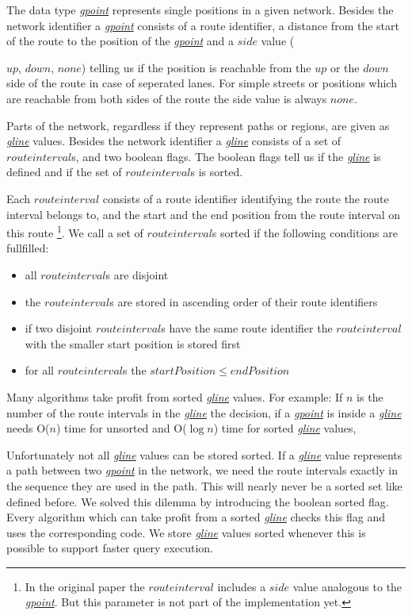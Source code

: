 \documentclass[a4paper]{article}
\newcommand{\dt}[1]{\textsl{\underline{#1}}}
\begin{document}
The data type \dt{gpoint} represents single positions in a given network. Besides the
network identifier a \dt{gpoint} consists of a route identifier, a distance from
the start of the route to the position of the \dt{gpoint} and a $side$ value
({$up$, $down$, $none$) telling us if the position is reachable from the $up$
or the $down$ side of the route in case of seperated lanes. For simple
streets or positions which are reachable from both sides of the route the side
value is always $none$.

Parts of the network, regardless if they represent paths or regions, are given as
\dt{gline} values. Besides the network identifier a \dt{gline} consists of a set
of $route interval$s, and two boolean flags. The boolean flags tell us if the
\dt{gline} is defined and if the set of $route interval$s is sorted.

Each $route interval$ consists of a route identifier identifying the route
the route interval belongs to, and the start and the end position from the
route interval on this route
\footnote{In the original paper the $route interval$ includes a $side$ value
analogous to the \dt{gpoint}. But this parameter is not part of the implementation yet.}.
We call a \label{sec:sortedgline} set of $route interval$s sorted if the following
conditions are fullfilled:
\begin{itemize}
	\item all $route interval$s are disjoint
	\item the $route interval$s are stored in ascending order of their route identifiers
	\item if two disjoint $route interval$s have the same route identifier the
$route interval$ with the smaller start position is stored first
	\item for all $route interval$s the $startPosition \le endPosition$
\end{itemize}
Many algorithms take profit from sorted \dt{gline} values. For example: If $n$
is the number of the route intervals in the \dt{gline} the
decision, if a \dt{gpoint} is inside a \dt{gline} needs O($n$) time for unsorted
and O($\log n$) time for sorted \dt{gline} values,

Unfortunately not all \dt{gline} values can be stored sorted. If a \dt{gline}
value represents a path between two \dt{gpoint} in the network, we need the
route intervals exactly in the sequence they are used in the path. This will
nearly never be a sorted set like defined before. We solved this dilemma by
introducing the boolean sorted flag. Every algorithm which can take profit from
a sorted \dt{gline} checks this flag and uses the corresponding code. We store \dt{gline}
values sorted whenever this is possible to support faster query execution.

}
\end{document}
